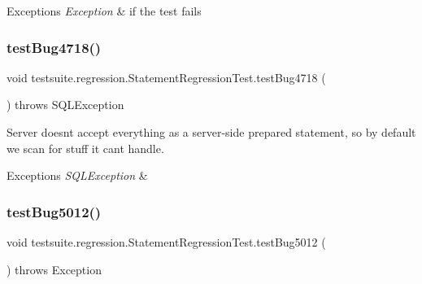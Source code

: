 \begin{DoxyExceptions}{Exceptions}
{\em Exception} & if the test fails \\
\hline
\end{DoxyExceptions}
\mbox{\label{classtestsuite_1_1regression_1_1_statement_regression_test_a4a5feeaaf1b8fb177b2f026231e14165}} 
\subsubsection{\texorpdfstring{test\+Bug4718()}{testBug4718()}}
{\footnotesize\ttfamily void testsuite.\+regression.\+Statement\+Regression\+Test.\+test\+Bug4718 (\begin{DoxyParamCaption}{ }\end{DoxyParamCaption}) throws S\+Q\+L\+Exception}

Server doesn\textquotesingle{}t accept everything as a server-\/side prepared statement, so by default we scan for stuff it can\textquotesingle{}t handle.


\begin{DoxyExceptions}{Exceptions}
{\em S\+Q\+L\+Exception} & \\
\hline
\end{DoxyExceptions}
\mbox{\label{classtestsuite_1_1regression_1_1_statement_regression_test_a9fbede1821be869adb354fa18fdc4686}} 
\subsubsection{\texorpdfstring{test\+Bug5012()}{testBug5012()}}
{\footnotesize\ttfamily void testsuite.\+regression.\+Statement\+Regression\+Test.\+test\+Bug5012 (\begin{DoxyParamCaption}{ }\end{DoxyParamCaption}) throws Exception}

